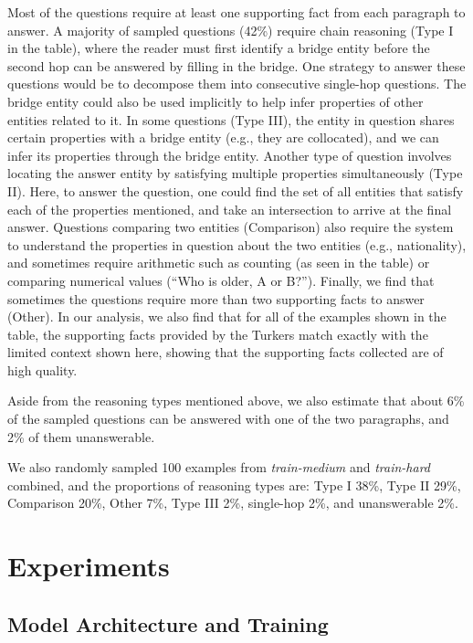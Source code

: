 Most of the questions  require at least one supporting fact from each paragraph to answer. A majority of sampled questions (42\%) require chain reasoning (Type I in the table), where the reader must first identify a bridge entity before the second hop can be answered by filling in the bridge. One strategy to answer these questions would be to decompose them into consecutive single-hop questions. The bridge entity could also be used implicitly to help infer properties of other entities related to it. In some questions (Type III), the entity in question shares certain properties with a bridge entity (e.g., they are collocated), and we can infer its properties through the bridge entity. Another type of question involves locating the answer entity by satisfying multiple properties simultaneously (Type II). Here, to answer the question, one could find the set of all entities that satisfy each of the properties mentioned, and take an intersection to arrive at the final answer. Questions comparing two entities (Comparison) also require the system to understand the properties in question about the two entities (e.g., nationality), and sometimes require arithmetic such as counting (as seen in the table) or comparing numerical values (``Who is older, A or B?''). Finally, we find that sometimes the questions require more than two supporting facts to answer (Other). In our analysis, we also find that for all of the examples shown in the table, the supporting facts provided by the Turkers match exactly with the limited context shown here, showing that the supporting facts collected are of high quality.

Aside from the reasoning types mentioned above, we also estimate that about 6\% of the sampled questions can be answered with one of the two paragraphs, and 2\% of them unanswerable.

We also randomly sampled 100 examples from \emph{train-medium} and \emph{train-hard} combined, and the proportions of reasoning types are: Type I 38\%, Type II 29\%, Comparison 20\%, Other 7\%, Type III 2\%, single-hop 2\%, and unanswerable 2\%.

\section{Experiments} \label{sec:exp}

\subsection{Model Architecture and Training} \label{sec:baseline}

